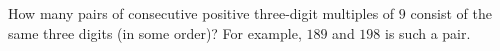 How many pairs of consecutive positive three-digit multiples of $9$ consist of the same three digits (in some order)? For example, $189$ and $198$ is such a pair.
